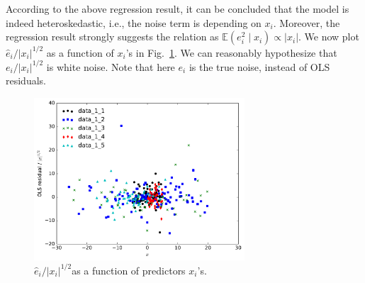 \documentclass{revtex4}
\begin{document}
According to the above regression result, it can be concluded that the model is indeed
heteroskedastic, i.e., the noise term is depending on $x_i$.  Moreover, the regression result
strongly suggests the relation as $\mathbb{E}\left(e^2_i\mid x_i\right)\propto\left|x_i\right|$.
We now plot $\widehat{e}_i/\left|x_i\right|^{1/2}$ as a function of $x_i$'s in Fig.~\ref{fig:pattern}.
We can reasonably hypothesize that $e_i/\left|x_i\right|^{1/2}$ is white noise. Note that here
$e_i$ is the true noise, instead of OLS residuals.
\begin{figure}[!ht]
  \centering
  \includegraphics[width=0.7\textwidth]{peek_pattern}
  \caption{$\widehat{e}_i/\left|x_i\right|^{1/2}$as a function of predictors $x_i$'s.}
  \label{fig:pattern}
\end{figure}
\end{document}

